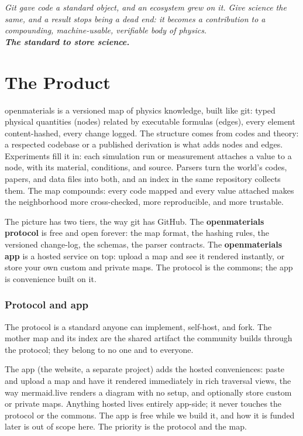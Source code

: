 \documentclass[11pt,a4paper]{article}
\begin{document}
\bigskip
\begin{center}
\color{abstrcol}\itshape
Git gave code a standard object, and an ecosystem grew on it. Give science the
same, and a result stops being a dead end: it becomes a contribution to a
compounding, machine-usable, verifiable body of physics.\\[0.5em]
\normalfont\bfseries The standard to store science.
\end{center}

\part{The Product}
\label{part:product}

\noindent
openmaterials is a versioned map of physics knowledge, built like git: typed
physical quantities (nodes) related by executable formulas (edges), every
element content-hashed, every change logged. The structure comes from codes and
theory: a respected codebase or a published derivation is what adds nodes and
edges. Experiments fill it in: each simulation run or measurement attaches a
value to a node, with its material, conditions, and source. Parsers turn the
world's codes, papers, and data files into both, and an index in the same
repository collects them. The map compounds: every code mapped and every value
attached makes the neighborhood more cross-checked, more reproducible, and more
trustable.

The picture has two tiers, the way git has GitHub. The \textbf{openmaterials
protocol} is free and open forever: the map format, the hashing rules, the
versioned change-log, the schemas, the parser contracts. The \textbf{openmaterials
app} is a hosted service on top: upload a map and see it rendered instantly, or
store your own custom and private maps. The protocol is the commons; the app is
convenience built on it.

\section{Protocol and app}

The protocol is a standard anyone can implement, self-host, and fork. The
mother map and its index are the shared artifact the community builds through
the protocol; they belong to no one and to everyone.

The app (the website, a separate project) adds the hosted conveniences: paste
and upload a map and have it rendered immediately in rich traversal views, the
way mermaid.live renders a diagram with no setup, and optionally store custom or
private maps. Anything hosted lives entirely app-side; it never touches the
protocol or the commons. The app is free while we build it, and how it is funded
later is out of scope here. The priority is the protocol and the map.
\end{document}
